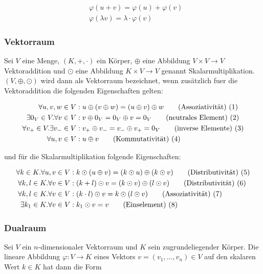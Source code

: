 \documentclass[a4paper,fontsize=12pt,toc=bib,halfparskip]{scrartcl}
\begin{document}
\begin{align}
	&\varphi(u+v) = \varphi(u) + \varphi(v) \\
	&\varphi(\lambda v) = \lambda \cdot \varphi(v)
\end{align}

\subsubsection{Vektorraum}
Sei $V$ eine Menge, $(K, +, \cdot )$ ein K\"orper, $\oplus$ eine Abbildung $V \times V \rightarrow V$  Vektoraddition und $\odot$ eine Abbildung $K \times V \rightarrow V$ genannt Skalarmultiplikation. $(V, \oplus, \odot)$ wird dann als Vektorraum bezeichnet, wenn zus\"atzlich fuer die Vektoraddition die folgenden Eigenschaften gelten: 

\begin{align}
	\forall u,v,w \in V&: u \oplus (v \oplus w ) = (u \oplus v ) \oplus w 	\tag{Assoziativit\"at) (\addtocounter{equation}{1}\theequation}\\
	\exists 0_V \in V. \forall v \in V&: v\oplus 0_V = 0_V \oplus v = 0_V 	\tag{neutrales Element) (\addtocounter{equation}{1}\theequation}\\
	\forall v_+ \in V. \exists v_- \in V&: v_+ \oplus v_- = v_- \oplus v_+ = 0_V	\tag{inverse Elemente) (\addtocounter{equation}{1}\theequation}\\
	\forall u, v \in V&: u \oplus v    \tag{Kommutativit\"at) (\addtocounter{equation}{1}\theequation}
\end{align}

und f\"ur die Skalarmultiplikation folgende Eigenschaften:

\begin{align}
	\forall k \in K. \forall u,v \in V&: k \odot (u \oplus v ) = (k \odot u ) \oplus( k \odot v) 	\tag{Distributivit\"at) (\addtocounter{equation}{1}\theequation}\\
	\forall k, l \in K. \forall v \in V&: ( k + l ) \odot v = (k \odot v ) \oplus( l \odot v) 	\tag{Distributivit\"at) (\addtocounter{equation}{1}\theequation}\\
	\forall k, l \in K. \forall v \in V&: (k \cdot l) \odot v = k \odot (l \odot v)	\tag{Assoziativit\"at) (\addtocounter{equation}{1}\theequation}\\
	\exists k_1 \in K. \forall v \in V&: k_1 \odot v = v	\tag{Einselement) (\addtocounter{equation}{1}\theequation}
\end{align}

\subsubsection{Dualraum}
Sei $V$ ein $n$-dimensionaler Vektorraum und $K$ sein zugrundeliegender K\"orper. Die lineare Abbildung $\varphi: V \rightarrow K$ eines Vektors $v = (v_1, ..., v_n) \in V$ auf den skalaren Wert $k \in K$ hat dann die Form
\end{document}
